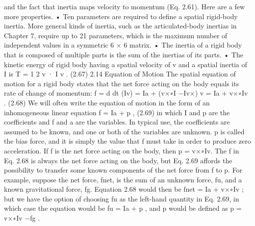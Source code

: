 and the fact that inertia maps velocity to momentum (Eq. 2.61). Here are a few more properties. • Ten parameters are required to define a spatial rigid-body inertia. More general kinds of inertia, such as the articulated-body inertias in Chapter 7, require up to 21 parameters, which is the maximum number of independent values in a symmetric 6 × 6 matrix. • The inertia of a rigid body that is composed of multiple parts is the sum of the inertias of its parts. • The kinetic energy of rigid body having a spatial velocity of v and a spatial inertia of I is T = 1 2 v · I v . (2.67) 2.14 Equation of Motion The spatial equation of motion for a rigid body states that the net force acting on the body equals its rate of change of momentum: f = d dt (Iv) = Ia + (v×∗I −Iv×) v = Ia + v×∗Iv . (2.68) We will often write the equation of motion in the form of an inhomogeneous linear equation f = Ia + p , (2.69) in which I and p are the coefficients and f and a are the variables. In typical use, the coefficients are assumed to be known, and one or both of the variables are unknown. p is called the bias force, and it is simply the value that f must take in order to produce zero acceleration. If f is the net force acting on the body, then p = v×∗Iv. The f in Eq. 2.68 is always the net force acting on the body, but Eq. 2.69 affords the possibility to transfer some known components of the net force from f to p. For example, suppose the net force, fnet, is the sum of an unknown force, fu, and a known gravitational force, fg. Equation 2.68 would then be fnet = Ia + v×∗Iv ; but we have the option of choosing fu as the left-hand quantity in Eq. 2.69, in which case the equation would be fu = Ia + p , and p would be defined as p = v×∗Iv −fg .

